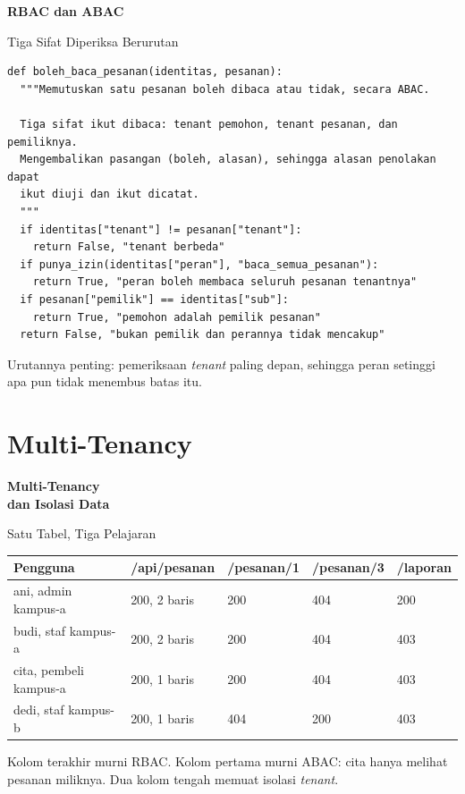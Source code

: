 \documentclass[aspectratio=169, table, 12pt]{beamer}
\begin{document}
\begin{frame}{\hfill}
  \centering
  \Huge{\textbf{RBAC dan ABAC}}
\end{frame}

\begin{frame}[fragile]{{\Large Tiga Sifat Diperiksa Berurutan}}
  \vspace{2pt}
\begin{lstlisting}[style=PythonStyle]
def boleh_baca_pesanan(identitas, pesanan):
  """Memutuskan satu pesanan boleh dibaca atau tidak, secara ABAC.

  Tiga sifat ikut dibaca: tenant pemohon, tenant pesanan, dan pemiliknya.
  Mengembalikan pasangan (boleh, alasan), sehingga alasan penolakan dapat
  ikut diuji dan ikut dicatat.
  """
  if identitas["tenant"] != pesanan["tenant"]:
    return False, "tenant berbeda"
  if punya_izin(identitas["peran"], "baca_semua_pesanan"):
    return True, "peran boleh membaca seluruh pesanan tenantnya"
  if pesanan["pemilik"] == identitas["sub"]:
    return True, "pemohon adalah pemilik pesanan"
  return False, "bukan pemilik dan perannya tidak mencakup"
\end{lstlisting}
  \vspace{2pt}
  {\small Urutannya penting: pemeriksaan \textit{tenant} paling depan,
  sehingga peran setinggi apa pun tidak menembus batas itu.}
\end{frame}

\section{Multi-Tenancy}

\begin{frame}{\hfill}
  \centering
  \Huge{\textbf{Multi-Tenancy\\dan Isolasi Data}}
\end{frame}

\begin{frame}{{\Large Satu Tabel, Tiga Pelajaran}}
  \vspace{6pt}
  \centering
  {\footnotesize
  \begin{tabularx}{\textwidth}{Yllll}
    \hline
    \textbf{Pengguna} & \textbf{/api/pesanan} & \textbf{/pesanan/1} & \textbf{/pesanan/3} & \textbf{/laporan} \\
    \hline
    ani, admin kampus-a & 200, 2 baris & 200 & 404 & 200 \\
    \hline
    budi, staf kampus-a & 200, 2 baris & 200 & 404 & 403 \\
    \hline
    cita, pembeli kampus-a & 200, 1 baris & 200 & 404 & 403 \\
    \hline
    dedi, staf kampus-b & 200, 1 baris & 404 & 200 & 403 \\
    \hline
  \end{tabularx}}

  \vspace{6pt}
  {\footnotesize Kolom terakhir murni RBAC. Kolom pertama murni ABAC: cita
  hanya melihat pesanan miliknya. Dua kolom tengah memuat isolasi
  \textit{tenant}.}
\end{frame}
\end{document}
